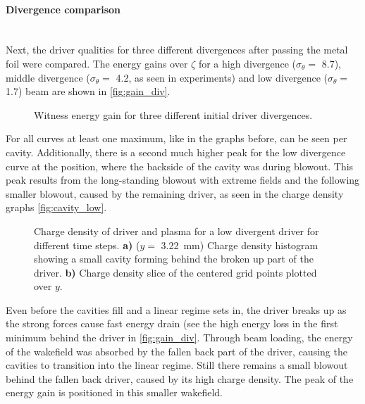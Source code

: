 \documentclass[bachelor_thesis]{subfiles}
\begin{document}
\paragraph*{Divergence comparison}\label{para:div_comp}\hspace{0pt} \\
Next, the driver qualities for three different divergences after passing the metal foil were compared. The energy gains over $\zeta$ for a high divergence ($\sigma_{\theta}=$ \qty{8.7}{\mrad}), middle divergence ($\sigma_{\theta}=$ \qty{4.2}{\mrad}, as seen in experiments) 
and low divergence ($\sigma_{\theta}=$ \qty{1.7}{\mrad}) beam are shown in \autoref{fig:gain_div}.
\begin{figure}
	\centering
	
	\caption{Witness energy gain for three different initial driver divergences.}
	\label{fig:gain_div}
\end{figure}
For all curves at least one maximum, like in the graphs before, can be seen per cavity. Additionally, there is a second much higher peak for the low divergence curve at the position, where the backside of the cavity was during blowout.
This peak results from the long-standing blowout with extreme fields and the following smaller blowout, caused by the remaining driver, as seen in the charge density graphs \autoref{fig:cavity_low}.

\begin{figure}
	\centering
	
	\caption{Charge density of driver and plasma for a low divergent driver for different time steps.
	\textbf{a)} ($y=$ \qty{3.22}{mm}) Charge density histogram showing a small cavity forming behind the broken up part of the driver.
	\textbf{b)} Charge density slice of the centered grid points plotted over $y$. 
	}
	\label{fig:cavity_low}
\end{figure}
Even before the cavities fill and a linear regime sets in, the driver breaks up as the strong forces cause fast energy drain (see the high energy loss in the first minimum behind the driver in \autoref{fig:gain_div}.
Through beam loading, the energy of the wakefield was absorbed by the fallen back part of the driver, causing the cavities to transition into the linear regime. 
Still there remains a small blowout behind the fallen back driver, caused by its high charge density. The peak of the energy gain is positioned in this smaller wakefield.
\end{document}
